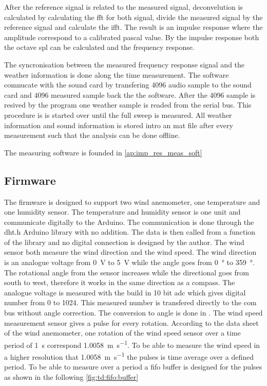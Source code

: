 After the reference signal is related to the measured signal, deconvelution is calculated by calculating the \gls{fft} for both signal, divide the measured signal by the reference signal and calculate the \gls{ifft}. The result is an impulse response where the amplitude correspond to a calibrated pascal value. By the impulse response both the octave \gls{spl} can be calculated and the frequency response. 

The syncronisation between the measured frequency response signal and the weather information is done along the time measurement. The \matlab software comnucate with the sound card by transfering 4096 audio sample to the sound card and 4096 measured sample back the the \matlab software. After the 4096 sample is resived by the program one weather sample is readed from the serial bus. This procedure is is started over until the full sweep is measured. All weather information and sound information is stored intro an mat file after every measurement such that the analysis can be done offline.

The measuring software is founded in  \autoref{ap:imp_res_meas_soft}

\subsection{Firmware}
The firmware is designed to support two wind anemometer, one temperature and one humidity sensor. The temperature and humidity sensor is one unit and communicate digitally to the Arduino. The communication is done through the dht.h Arduino library with no addition. The data is then called from a function of the library and no digital connection is designed by the author. 
The wind sensor both measure the wind direction and the wind speed. The wind direction is an analogue voltage from \SI{0}{\volt} to \SI{5}{\volt} while the angle goes from \SI{0}{\degree} to \SI{359}{\degree}. The rotational angle from the sensor increases while the directional goes from south to west, therefore it works in the same direction as a compass. The analogue voltage is measured with the build in 10 bit \gls{adc} which gives digital number from 0 to 1024. This measured number is transfered directly to the com bus without angle correction. The conversion to angle is done in \matlab . The wind speed measurement sensor gives a pulse for every rotation. According to the data sheet of the wind anemometer, one rotation of the wind speed sensor over a time period of \SI{1}{\second} correspond \SI{1.0058}{\meter\per\second}. To be able to measure the wind speed in a higher resolution that \SI{1.0058}{\meter\per\second} the pulses is time average over a defined period. To be able to measure over a period a \gls{fifo} buffer is designed for the pulses as shown in the following \autoref{fig:td:fifo:buffer} 

